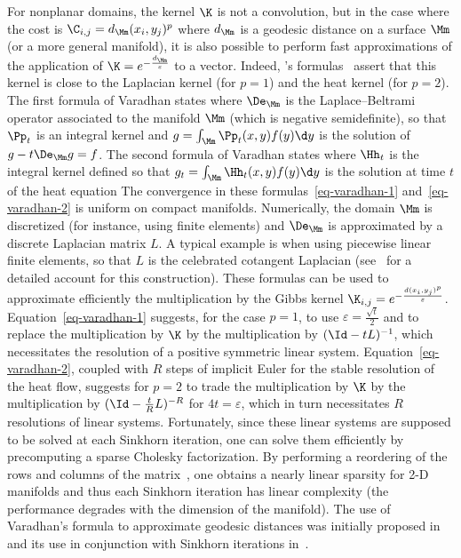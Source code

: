 \begin{rem}\label{rem-geod-heat}
For nonplanar domains, the kernel $\K$ is not a convolution, but in the case where the cost is $\C_{i,j}=d_\Mm(x_i,y_j)^p$ where $d_\Mm$ is a geodesic distance on a surface $\Mm$ (or a more general manifold), it is also possible to perform fast approximations of the application of $\K=e^{-\frac{d_\Mm}{\varepsilon}}$ to a vector. Indeed, \citeauthor{varadhan-1967}'s formulas~\citeyearpar{varadhan-1967} assert that this kernel is close to the Laplacian kernel (for $p=1$) and the heat kernel (for $p=2$). 
%
The first formula of Varadhan states
where $\De_{\Mm}$ is the Laplace--Beltrami operator associated to the manifold $\Mm$ (which is negative semidefinite), so that 
$\Pp_t$ is an integral kernel and $g = \int_\Mm \Pp_t(x,y) f(y) \d y$ is the solution of $g - t \De_{\Mm} g = f$. 
%
The second formula of Varadhan states
where  $\Hh_t$ is the integral kernel defined so that $g_t = \int_\Mm \Hh_t(x,y) f(y) \d y$ is the solution at time $t$ of the heat equation
The convergence in these formulas~\eqref{eq-varadhan-1} and~\eqref{eq-varadhan-2} is uniform on compact manifolds.
%
Numerically, the domain $\Mm$ is discretized (for instance, using finite elements) and $\De_\Mm$ is approximated by a discrete Laplacian matrix $L$. A typical example is when using piecewise linear finite elements, so that $L$ is the celebrated cotangent Laplacian (see~\citep{botsch-2010} for a detailed account for this construction).
%
These formulas can be used to approximate efficiently the multiplication by the Gibbs kernel $\K_{i,j}=e^{-\frac{d(x_i,y_j)^p}{\varepsilon}}$.
%
Equation~\eqref{eq-varadhan-1} suggests, for the case $p=1$, to use $\varepsilon=\frac{\sqrt{t}}{2}$ and to replace the multiplication by $\K$ by the multiplication by $(\Id-t L)^{-1}$, which necessitates the resolution of a positive symmetric linear system.
%
Equation~\eqref{eq-varadhan-2}, coupled with $R$ steps of implicit Euler for the stable resolution of the heat flow, suggests for $p=2$ to trade the multiplication by $\K$ by the multiplication by $(\Id-\frac{t}{R} L)^{-R}$ for $4 t=\varepsilon$, which in turn necessitates $R$ resolutions of linear systems. Fortunately, since these linear systems are supposed to be solved at each Sinkhorn iteration, one can solve them efficiently by precomputing a sparse Cholesky factorization. By performing a reordering of the rows and columns of the matrix~\citep{george1989evolution}, one obtains a nearly linear sparsity for 2-D manifolds and thus each Sinkhorn iteration has linear complexity (the performance degrades with the dimension of the manifold). 
%
The use of Varadhan's formula to approximate geodesic distances was initially proposed in~\citep{Crane2013} and its use in conjunction with Sinkhorn iterations in~\citep{2015-solomon-siggraph}.
%
\end{rem}



